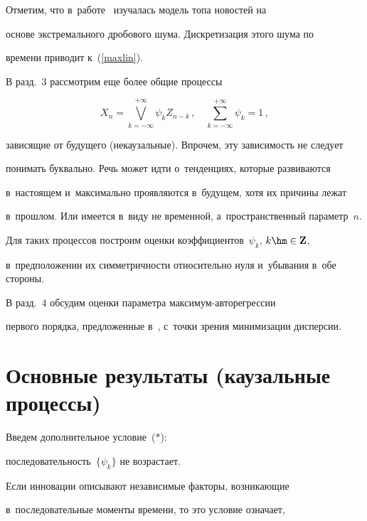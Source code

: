 Отметим, что в~работе~\cite{LebTop} изучалась модель топа новостей на


основе экстремального дробового шума. Дискретизация этого шума по


времени приводит к~(\ref{maxlin}).





В разд.~3 рассмотрим еще более общие процессы


\begin{equation}\label{maxlin2}


X_n=\bigvee_{k=-\infty}^{+\infty}\psi_kZ_{n-k}\,,\quad 


\sum\limits_{k=-\infty}^{+\infty}\psi_k=1\,,


\end{equation}


зависящие от будущего (некаузальные). Впрочем, эту зависимость не следует


понимать буквально. Речь может идти о~тенденциях, которые развиваются 


в~настоящем и~максимально проявляются в~будущем, хотя их причины лежат 


в~прошлом. Или имеется в~виду не временной, а~пространственный параметр~$n$.


Для таких процессов построим оценки коэффициентов~$\psi_k$, $k\hm\in {\bf Z}$, 


в~предположении их симметричности относительно нуля и~убывания в~обе стороны.





В разд.~4 обсудим оценки параметра максимум-авторегрессии


первого порядка, предложенные в~\cite{Ferr}, с~точки зрения минимизации дисперсии.





\section{Основные результаты (каузальные процессы)}





Введем дополнительное условие~($*$):


последовательность~$\{\psi_k\}$ не возрастает.


Если инновации описывают независимые факторы, возникающие 


в~последовательные моменты времени, то это условие означает,


